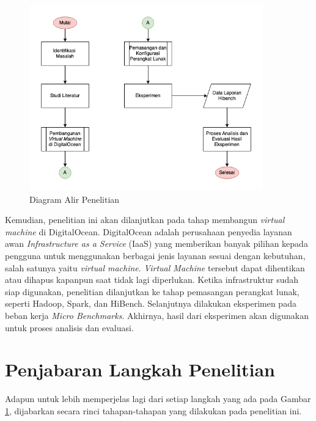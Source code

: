 \begin{figure}[h!]
    \centering
    \includegraphics[width=0.9\textwidth]{figures/ch03/Diagram Tugas Akhir.png}
    \caption{Diagram Alir Penelitian}
    \label{fig:diagram alir}
\end{figure}

Kemudian, penelitian ini akan dilanjutkan pada tahap membangun \textit{virtual machine} di DigitalOcean. DigitalOcean adalah perusahaan penyedia layanan awan \textit{Infrastructure as a Service} (IaaS) yang memberikan banyak pilihan kepada pengguna untuk menggunakan berbagai jenis layanan sesuai dengan kebutuhan, salah satunya yaitu \textit{virtual machine}. \textit{Virtual Machine} tersebut dapat dihentikan atau dihapus kapanpun saat tidak lagi diperlukan. Ketika infrastruktur sudah siap digunakan, penelitian dilanjutkan ke tahap pemasangan perangkat lunak, seperti Hadoop, Spark, dan HiBench. Selanjutnya dilakukan eksperimen pada beban kerja \textit{Micro Benchmarks}. Akhirnya, hasil dari eksperimen akan digunakan untuk proses analisis dan evaluasi.

\section{Penjabaran Langkah Penelitian}
Adapun untuk lebih memperjelas lagi dari setiap langkah yang ada pada Gambar \ref{fig:diagram alir}, dijabarkan secara rinci tahapan-tahapan yang dilakukan pada penelitian ini.

